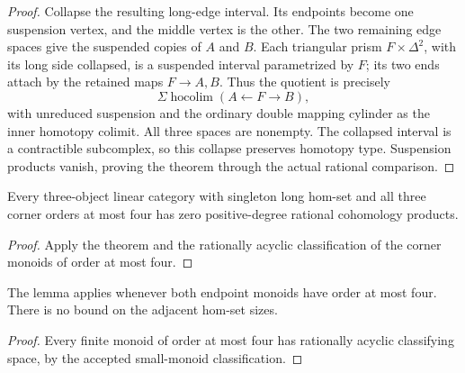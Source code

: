 \begin{proof}
Collapse the resulting long-edge interval.  Its endpoints
become one suspension vertex, and the middle vertex is
the other.  The two remaining edge spaces give the
suspended copies of $A$ and $B$.  Each triangular
prism $F\times\Delta^2$, with its long side collapsed,
is a suspended interval parametrized by $F$; its two
ends attach by the retained maps $F\to A,B$.
Thus the quotient is precisely
\[
 \Sigma\operatorname{hocolim}(A\longleftarrow F
                                      \longrightarrow B),
\]
with unreduced suspension and the ordinary double
mapping cylinder as the inner homotopy colimit.
All three spaces are nonempty.  The collapsed interval
is a contractible subcomplex, so this collapse preserves
homotopy type.  Suspension products vanish, proving
the theorem through the actual rational comparison.
\end{proof}

\begin{corollary}\label{C:small-corners-singleton-long}
Every three-object linear category with singleton long
hom-set and all three corner orders at most four has
zero positive-degree rational cohomology products.
\end{corollary}
\begin{proof}
Apply the theorem and the rationally acyclic classification
of the corner monoids of order at most four.
\end{proof}

\begin{corollary}\label{C:small-ends-singleton-long}
The lemma applies whenever both endpoint monoids have
order at most four.  There is no bound on the adjacent
hom-set sizes.
\end{corollary}
\begin{proof}
Every finite monoid of order at most four has rationally
acyclic classifying space, by the accepted small-monoid
classification.
\end{proof}
